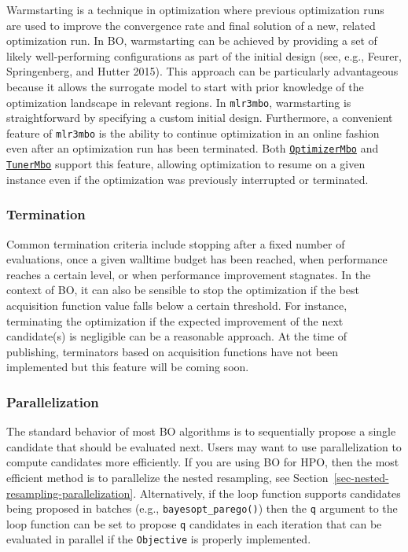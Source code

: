 Warmstarting is a technique in optimization where previous optimization
runs are used to improve the convergence rate and final solution of a
new, related optimization run. In BO, warmstarting can be achieved by
providing a set of likely well-performing configurations as part of the
initial design (see, e.g., Feurer, Springenberg, and Hutter 2015). This
approach can be particularly advantageous because it allows the
surrogate model to start with prior knowledge of the optimization
landscape in relevant regions. In \texttt{mlr3mbo}, warmstarting is
straightforward by specifying a custom initial design. Furthermore, a
convenient feature of \texttt{mlr3mbo} is the ability to continue
optimization in an online fashion even after an optimization run has
been terminated. Both
\href{https://mlr3mbo.mlr-org.com/reference/mlr_optimizers_mbo.html}{\texttt{OptimizerMbo}}
and
\href{https://mlr3mbo.mlr-org.com/reference/mlr_tuners_mbo.html}{\texttt{TunerMbo}}
support this feature, allowing optimization to resume on a given
instance even if the optimization was previously interrupted or
terminated.

\hypertarget{termination}{%
\subsubsection*{Termination}\label{termination}}

Common termination criteria include stopping after a fixed number of
evaluations, once a given walltime budget has been reached, when
performance reaches a certain level, or when performance improvement
stagnates. In the context of BO, it can also be sensible to stop the
optimization if the best acquisition function value falls below a
certain threshold. For instance, terminating the optimization if the
expected improvement of the next candidate(s) is negligible can be a
reasonable approach. At the time of publishing, terminators based on
acquisition functions have not been implemented but this feature will be
coming soon.

\hypertarget{parallelization}{%
\subsubsection*{Parallelization}\label{parallelization}}

The standard behavior of most BO algorithms is to sequentially propose a
single candidate that should be evaluated next. Users may want to use
parallelization to compute candidates more efficiently. If you are using
BO for HPO, then the most efficient method is to parallelize the nested
resampling, see Section~\ref{sec-nested-resampling-parallelization}.
Alternatively, if the loop function supports candidates being proposed
in batches (e.g., \texttt{bayesopt\_parego()}) then the \texttt{q}
argument to the loop function can be set to propose \texttt{q}
candidates in each iteration that can be evaluated in parallel if the
\texttt{Objective} is properly implemented.


